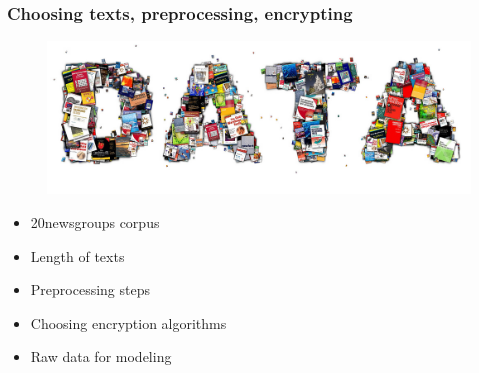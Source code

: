 \documentclass{beamer}
\begin{document}

\begin{frame}
\frametitle{Choosing texts, preprocessing, encrypting}

\begin{figure}
	\includegraphics[scale=0.2]{data.jpg}
	\centering
\end{figure}

\begin{block}{}
\begin{itemize}
	\pause
	\item 20newsgroups corpus
	\pause
	\item Length of texts
	\pause
	\item Preprocessing steps
	\pause
	\item Choosing encryption algorithms
	\pause
	\item Raw data for modeling
\end{itemize}
\end{block}


\end{frame}
\end{document}
